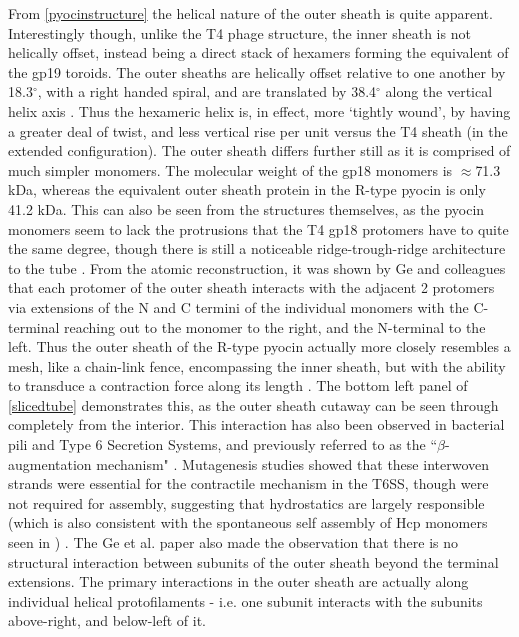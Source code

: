 From \vref{pyocinstructure} the helical nature of the outer sheath is quite apparent. Interestingly though, unlike the T4 phage structure, the inner sheath is not helically offset, instead being a direct stack of hexamers forming the equivalent of the gp19 toroids. The outer sheaths are helically offset relative to one another by 18.3$^{\circ}$, with a right handed spiral, and are translated by 38.4$^{\circ}$ along the vertical helix axis \citep{Ge2015, Kube2015a}. Thus the hexameric helix is, in effect, more `tightly wound', by having a greater deal of twist, and less vertical rise per unit versus the T4 sheath (in the extended configuration). The outer sheath differs further still as it is comprised of much simpler monomers. The molecular weight of the gp18 monomers is $\approx$71.3 kDa, whereas the equivalent outer sheath protein in the R-type pyocin is only 41.2 kDa. This can also be seen from the structures themselves, as the pyocin monomers seem to lack the protrusions that the T4 gp18 protomers have to quite the same degree, though there is still a noticeable ridge-trough-ridge architecture to the tube \citep{Kube2015a}. From the atomic reconstruction, it was shown by Ge and colleagues that each protomer of the outer sheath interacts with the adjacent 2 protomers via extensions of the N and C termini of the individual monomers with the C-terminal reaching out to the monomer to the right, and the N-terminal to the left. Thus the outer sheath of the R-type pyocin actually more closely resembles a mesh, like a chain-link fence, encompassing the inner sheath, but with the ability to transduce a contraction force along its length \citep{Ge2015}. The bottom left panel of \vref{slicedtube} demonstrates this, as the outer sheath cutaway can be seen through completely from the interior. This interaction has also been observed in bacterial pili and Type 6 Secretion Systems, and previously referred to as the ``$\beta$-augmentation mechanism" \citep{Remaut2006}. Mutagenesis studies showed that these interwoven strands were essential for the contractile mechanism in the T6SS, though were not required for assembly, suggesting that hydrostatics are largely responsible (which is also consistent with the spontaneous self assembly of Hcp monomers seen in \cite{Ballister2008}) \citep{Kudryashev2015, Clemens2015}. The Ge et al. paper also made the observation that there is no structural interaction between subunits of the outer sheath beyond the terminal extensions. The primary interactions in the outer sheath are actually along individual helical protofilaments - i.e. one subunit interacts with the subunits above-right, and below-left of it. 


